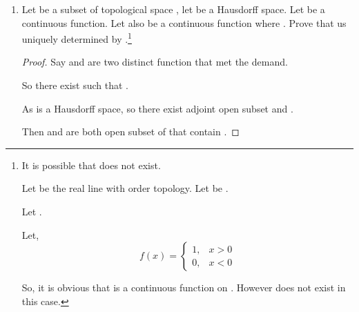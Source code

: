 \begin{enumerate}
\begin{proof}
            Thus, there must be a maximal element  of , that is a subset of all element of .

            Let  be the set be the union of all element of .

            As  is finite,  is closed. And all neighbourhood of  intersect with . Thus 
            
            As  is a subset of , . So  is closed. And  is a continuous function on .

      \end{proof}

      \item Let  be a subset of topological space , let  be a Hausdorff space. Let  be a continuous function. Let  also be a continuous function where . Prove that  us uniquely determined by .\footnote{
            It is possible that  does not exist.

            Let  be the real line with order topology. Let  be .

            Let .

            Let,
            \begin{equation*}
                  f(x) = \begin{cases}
                        1, & x > 0 \\
                        0, & x < 0
                  \end{cases}
            \end{equation*}

            So, it is obvious that  is a continuous function on . However  does not exist in this case.
      }

      \begin{proof}
            Say  and  are two distinct function that met the demand.

            So there exist  such that .
            
            As  is a Hausdorff space, so there exist adjoint open subset  and .

            Then  and  are both open subset of  that contain . 


\end{proof}
\end{enumerate}

